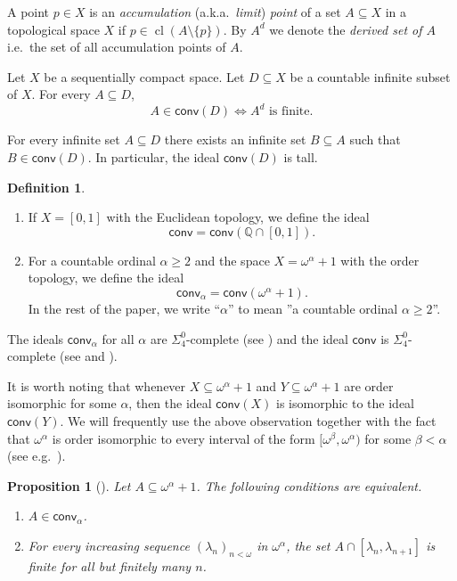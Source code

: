 \documentclass{amsart}
\theoremstyle{plain}
\newtheorem{proposition}[theorem]{Proposition}
\theoremstyle{definition}
\newtheorem{definition}[theorem]{Definition}
\theoremstyle{remark}
\newcommand{\bQ}{\mathbb{Q}}
\newcommand{\Q}{\bQ}
\newcommand{\conv}{\mathsf{conv}}
\DeclareMathOperator{\closure}{cl}
\renewcommand{\subset}{\subseteq}
\begin{document}
A point $p\in X$ is an \emph{accumulation} (a.k.a.~\emph{limit}) \emph{point} of a set $A\subseteq X$ in a topological space $X$ if $p\in \closure(A\setminus\{p\})$.
By $A^d$ we denote the \emph{derived set of $A$} i.e.~the set of  all accumulation  points of $A$.

    Let $X$ be a sequentially compact space.
    Let $D\subseteq X$ be a countable infinite subset of $X$.
  For every $A\subseteq D$, 
$$A\in \conv(D) \iff A^{d} \text{ is finite}.$$


For every infinite set $A\subseteq D$ there exists an infinite set $B\subseteq A$ such that  $B\in \conv(D)$. In particular, the ideal  $\conv(D)$ is tall.\label{lem:conv-ideal-via-derivative-set:item-4}


\begin{definition}
\ 
\begin{enumerate}
    \item 
If $X=[0,1]$ with the Euclidean topology, we define the ideal
$$\conv = \conv(\Q\cap [0,1]).$$
\item For a countable  ordinal $\alpha\geq 2$ and 
the space $X=\omega^{\alpha}+1$ with the order topology, we define the ideal
$$\conv_{\alpha} = \conv(\omega^{\alpha}+1).$$
In the rest of the paper, we write ``$\alpha$'' to mean ''a countable ordinal  $\alpha\geq 2$''.
\end{enumerate}
\end{definition}
The ideals $\conv_\alpha$ for all $\alpha$ 
are $\Sigma^0_4$-complete 
(see \cite[Corollary~7.4]{critical-ideals-RF-MK-AK})
and the ideal $\conv$ is $\Sigma^0_4$-complete (see \cite[Proposition~4.9]{MR4584767} and \cite[p.~21]{alcantara-phd-thesis}).


It is worth noting that whenever $X\subset \omega^\alpha+1$ and $Y\subset \omega^\alpha+1$ are order isomorphic for some $\alpha$, then the ideal $\conv(X)$ is isomorphic to the ideal $\conv(Y)$.
We will frequently use the above observation together with the fact that $\omega^\alpha$ is order isomorphic to every interval of the form $[\omega^\beta, \omega^\alpha)$ for some $\beta<\alpha$ (see e.g.~\cite[Exercise 5 in Chapter I]{MR597342}).


\begin{proposition}[\cite{critical-ideals-RF-MK-AK}]
\label{prop:gwiazdka}
Let  $A\subseteq \omega^{\alpha}+1$.
The following conditions are equivalent.
\begin{enumerate}
    \item $A\in \conv_\alpha$.
    \item For every increasing sequence $(\lambda_n)_{n<\omega}$ in $\omega^\alpha$, the set
    $A\cap [\lambda_n, \lambda_{n+1}]$
is finite for all but finitely many $n$.
\end{enumerate}\end{proposition}
\end{document}
